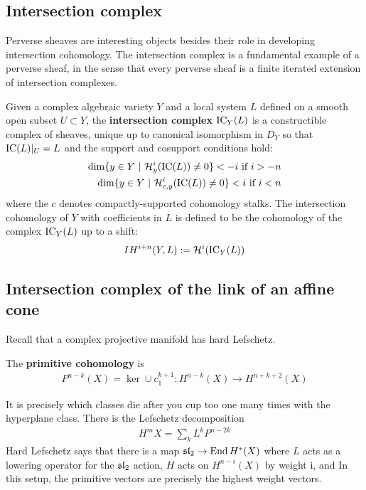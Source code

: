 \documentclass[12pt]{article}
\begin{document}
\subsection{Intersection complex}
Perverse sheaves are interesting objects besides their role in developing 
intersection cohomology. The intersection complex is a fundamental example of a perverse
sheaf, in the sense that every perverse sheaf is a finite iterated extension
 of intersection complexes.

\begin{definition}
    Given a complex algebraic variety $Y$ and a local system $L$ defined 
    on a smooth open subset $U\subset Y$, the \textbf{intersection complex}
    $\operatorname{IC}_Y(L)$ is a constructible complex of sheaves, unique up to 
    canonical isomorphism in $D_Y$ so that $\operatorname{IC}(L)\vert_U = L$ and the 
    support and cosupport conditions hold: \begin{align*}
        \dim\{y\in Y \ \vert \  {\mathcal{H}}^i_y(\operatorname{IC}(L)) \neq 0\} < - i \text{ if $i>-n$} \\
        \dim\{y\in Y \ \vert \  {\mathcal{H}}^i_{c,y}(\operatorname{IC}(L)) \neq 0\} < i \text{ if $i < n$}
    \end{align*} where the $c$ denotes compactly-supported cohomology stalks.
    The intersection cohomology of $Y$ with coefficients in $L$ is defined to be
    the cohomology of the complex $\operatorname{IC}_Y(L)$ up to a shift: \begin{align*}
        IH^{i+n}(Y,L) := {\mathcal{H}}^{i}(\operatorname{IC}_Y(L))
    \end{align*}
\end{definition}

\subsection{Intersection complex of the link of an affine cone}
Recall that a complex projective manifold has hard Lefschetz.

\begin{definition}
    The \textbf{primitive cohomology} is \begin{align*}
    P^{n-k}(X) = \ker \cup c_1^{k+1}: H^{n-k}(X) \to H^{n+k+2}(X)
\end{align*} 
\end{definition}
It is precisely which classes die after 
you cup too one many times with the hyperplane class. There is the Lefschetz
decomposition \begin{align*}
    H^mX = \sum_k L^k P^{n-2k}
\end{align*} Hard Lefschetz says that there is a map $\mathfrak{sl}_2 \to \operatorname{End} H^*(X)$
where $L$ acts as a lowering operator for the $\mathfrak{sl}_2$ action, $H$ acts on $H^{n-i}(X)$
by weight i, and 
In this setup, the primitive vectors are precisely the highest weight vectors.
\end{document}
